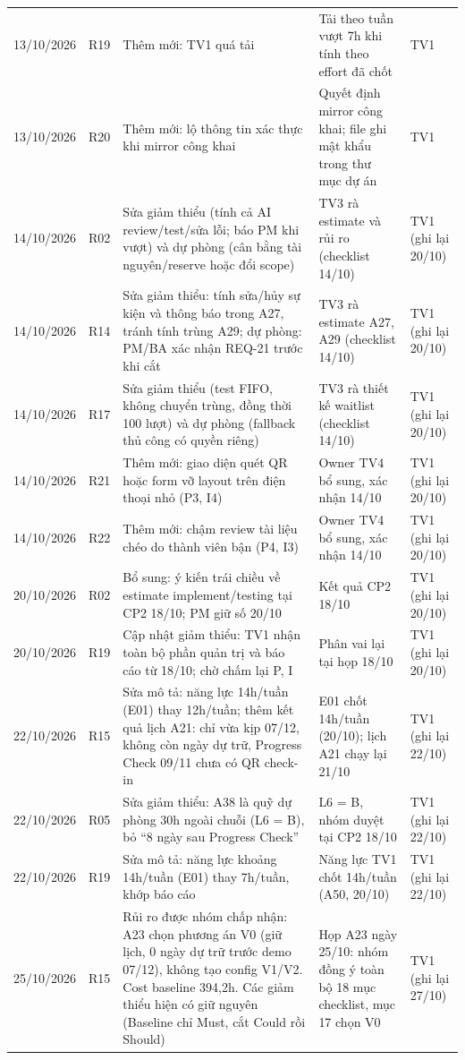 \begin{landscape}
\begin{longtable}{L{2.82cm}L{1.13cm}L{7.77cm}L{6.07cm}L{2.11cm}}
13/10/2026 & R19 & Thêm mới: TV1 quá tải & Tải theo tuần vượt 7h khi tính theo effort đã chốt & TV1 \\
13/10/2026 & R20 & Thêm mới: lộ thông tin xác thực khi mirror công khai & Quyết định mirror công khai; file ghi mật khẩu trong thư mục dự án & TV1 \\
14/10/2026 & R02 & Sửa giảm thiểu (tính cả AI review/test/sửa lỗi; báo PM khi vượt) và dự phòng (cân bằng tài nguyên/reserve hoặc đổi scope) & TV3 rà estimate và rủi ro (checklist 14/10) & TV1 (ghi lại 20/10) \\
14/10/2026 & R14 & Sửa giảm thiểu: tính sửa/hủy sự kiện và thông báo trong A27, tránh tính trùng A29; dự phòng: PM/BA xác nhận REQ-21 trước khi cắt & TV3 rà estimate A27, A29 (checklist 14/10) & TV1 (ghi lại 20/10) \\
14/10/2026 & R17 & Sửa giảm thiểu (test FIFO, không chuyển trùng, đồng thời 100 lượt) và dự phòng (fallback thủ công có quyền riêng) & TV3 rà thiết kế waitlist (checklist 14/10) & TV1 (ghi lại 20/10) \\
14/10/2026 & R21 & Thêm mới: giao diện quét QR hoặc form vỡ layout trên điện thoại nhỏ (P3, I4) & Owner TV4 bổ sung, xác nhận 14/10 & TV1 (ghi lại 20/10) \\
14/10/2026 & R22 & Thêm mới: chậm review tài liệu chéo do thành viên bận (P4, I3) & Owner TV4 bổ sung, xác nhận 14/10 & TV1 (ghi lại 20/10) \\
20/10/2026 & R02 & Bổ sung: ý kiến trái chiều về estimate implement/testing tại CP2 18/10; PM giữ số 20/10 & Kết quả CP2 18/10 & TV1 (ghi lại 20/10) \\
20/10/2026 & R19 & Cập nhật giảm thiểu: TV1 nhận toàn bộ phần quản trị và báo cáo từ 18/10; chờ chấm lại P, I & Phân vai lại tại họp 18/10 & TV1 (ghi lại 20/10) \\
22/10/2026 & R15 & Sửa mô tả: năng lực 14h/tuần (E01) thay 12h/tuần; thêm kết quả lịch A21: chỉ vừa kịp 07/12, không còn ngày dự trữ, Progress Check 09/11 chưa có QR check-in & E01 chốt 14h/tuần (20/10); lịch A21 chạy lại 21/10 & TV1 (ghi lại 22/10) \\
22/10/2026 & R05 & Sửa giảm thiểu: A38 là quỹ dự phòng 30h ngoài chuỗi (L6 = B), bỏ \enquote{8 ngày sau Progress Check} & L6 = B, nhóm duyệt tại CP2 18/10 & TV1 (ghi lại 22/10) \\
22/10/2026 & R19 & Sửa mô tả: năng lực khoảng 14h/tuần (E01) thay 7h/tuần, khớp báo cáo & Năng lực TV1 chốt 14h/tuần (A50, 20/10) & TV1 (ghi lại 22/10) \\
25/10/2026 & R15 & Rủi ro được nhóm chấp nhận: A23 chọn phương án V0 (giữ lịch, 0 ngày dự trữ trước demo 07/12), không tạo config V1/V2. Cost baseline 394,2h. Các giảm thiểu hiện có giữ nguyên (Baseline chỉ Must, cắt Could rồi Should) & Họp A23 ngày 25/10: nhóm đồng ý toàn bộ 18 mục checklist, mục 17 chọn V0 & TV1 (ghi lại 27/10) \\

\end{longtable}
\end{landscape}
